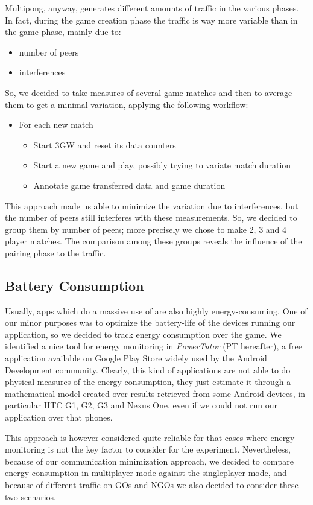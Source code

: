 Multipong, anyway, generates different amounts of traffic in the various phases. In fact, during the game creation phase the traffic is way more variable than in the game phase, mainly due to:

\begin{itemize}
\item number of peers
\item \wifi{} interferences
\end{itemize}

So, we decided to take measures of several game matches and then to average them to get a minimal variation, applying the following workflow:

\begin{itemize}
\item For each new match
	\begin{itemize}
	\item Start 3GW and reset its data counters
	\item Start a new game and play, possibly trying to variate match duration
	\item Annotate game transferred data and game duration
	\end{itemize}
\end{itemize}

This approach made us able to minimize the variation due to interferences, but the number of peers still interferes with these measurements. So, we decided to group them by number of peers; more precisely we chose to make 2, 3 and 4 player matches. The comparison among these groups reveals the influence of the pairing phase to the traffic.

\subsection{Battery Consumption}

Usually, apps which do a massive use of \wifi{} are also highly energy-consuming. One of our minor purposes was to optimize the battery-life of the devices running our application, so we decided to track energy consumption over the game. We identified a nice tool for energy monitoring in \textit{PowerTutor} (PT hereafter), a free application available on Google Play Store widely used by the Android Development community. Clearly, this kind of applications are not able to do physical measures of the energy consumption, they just estimate it through a mathematical model created over results retrieved from some Android devices, in particular HTC G1, G2, G3 and Nexus One, even if we could not run our application over that phones. 

This approach is however considered quite reliable for that cases where energy monitoring is not the key factor to consider for the experiment. Nevertheless, because of our communication minimization approach, we decided to compare energy consumption in multiplayer mode against the singleplayer mode, and because of different traffic on GOs and NGOs we also decided to consider these two scenarios.
